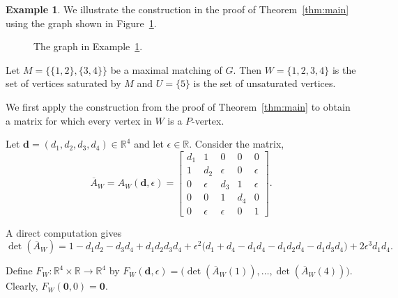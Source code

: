 \documentclass[12pt,reqno]{amsart}
\theoremstyle{plain}
\theoremstyle{definition}
\newtheorem{example}{Example}
\theoremstyle{block}
\theoremstyle{remark}
\numberwithin{equation}{section}
\begin{document}
\begin{example}\label{ex:2}
We illustrate the construction in the proof of Theorem~\ref{thm:main}
using the graph shown in Figure~\ref{fig:2}.

\begin{figure}[H]
    \centering
    \caption{The graph in Example~\ref{ex:2}.}
    \label{fig:2}
\end{figure}

Let
\(
M=\bigl\{\{1,2\},\{3,4\}\bigr\}
\)
be a maximal matching of \(G\). Then
\(
W=\{1,2,3,4\}
\)
is the set of vertices saturated by \(M\) and
\(
U=\{5\}
\)
is the set of unsaturated vertices.

We first apply the construction from the proof of
Theorem~\ref{thm:main} to obtain a matrix for which every vertex in
\(W\) is a \(P\)-vertex.

Let
\(
\mathbf d=(d_1,d_2,d_3,d_4)\in\mathbb R^4
\)
and let \(\epsilon\in\mathbb R\). Consider the matrix,
\[
\overline A_W=A_W(\mathbf d,\epsilon)
=
\begin{bmatrix}
d_1&1&0&0&0\\
1&d_2&\epsilon&0&\epsilon\\
0&\epsilon&d_3&1&\epsilon\\
0&0&1&d_4&0\\
0&\epsilon&\epsilon&0&1
\end{bmatrix}.
\]

A direct computation gives
\[
\det(\overline A_W)
=
1-d_1d_2-d_3d_4+d_1d_2d_3d_4
+\epsilon^2
\bigl(
d_1+d_4-d_1d_4-d_1d_2d_4-d_1d_3d_4
\bigr)
+2\epsilon^3d_1d_4.
\]

Define
\(
F_W:\mathbb R^4\times\mathbb R\longrightarrow\mathbb R^4
\)
by
\(
F_W(\mathbf d,\epsilon)
=
\bigl(
\det(\overline A_W(1)),
\ldots,
\det(\overline A_W(4))
\bigr).
\)\\
Clearly,
\(
F_W(\mathbf 0,0)=\mathbf 0.
\)


\end{example}
\end{document}
